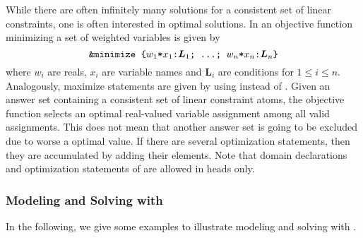 While there are often infinitely many solutions for a consistent set of linear constraints, 
one is often interested in optimal solutions. 
%
In  an objective function minimizing a set of weighted variables is given by   
\[
 \texttt{\&minimize\text{ }\{$w_1$*$x_1$:$\boldsymbol{L}_1$;\text{ }\dots;\text{ }$w_n$*$x_n$:$\boldsymbol{L}_n$\}}
\]
where $w_i$ are reals, $x_i$ are variable names and $\boldsymbol{L}_i$ are conditions for $1 \leq i\leq n$. 
%
Analogously, maximize statements are given by using  instead of . 
%
Given an answer set containing a consistent set of linear constraint atoms, 
the objective function selects an optimal real-valued variable assignment among all valid assignments. 
%
This does not mean that another answer set is going to be excluded due to worse a optimal value. 
%
If there are several optimization statements, then they are accumulated by adding their elements. 
%
Note that domain declarations and optimization statements of  are allowed in heads only. 


\subsubsection{Modeling and Solving with }

In the following, we give some examples to illustrate modeling and solving with .

